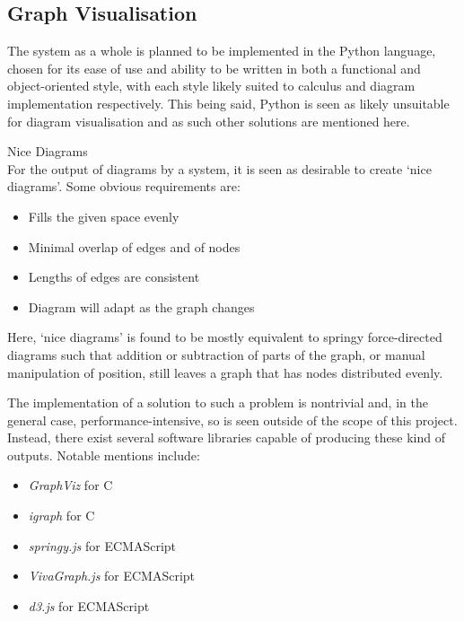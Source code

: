 \subsection{Graph Visualisation}

    The system as a whole is planned to be implemented in the Python language, chosen for its ease of use and ability to be written in both a functional and object-oriented style, with each style likely suited to calculus and diagram implementation respectively.
    This being said, Python is seen as likely unsuitable for diagram visualisation and as such other solutions are mentioned here.\\
    
    \begin{definition*}{Nice Diagrams\\}
        For the output of diagrams by a system, it is seen as desirable to create `nice diagrams'.
        Some obvious requirements are:
        \begin{itemize}
            \item Fills the given space evenly
            \item Minimal overlap of edges and of nodes
            \item Lengths of edges are consistent
            \item Diagram will adapt as the graph changes
        \end{itemize}
    \end{definition*}
    Here, `nice diagrams' is found to be mostly equivalent to springy force-directed diagrams such that addition or subtraction of parts of the graph, or manual manipulation of position, still leaves a graph that has nodes distributed evenly.


    \begin{examples}
        The implementation of a solution to such a problem is nontrivial and, in the general case, performance-intensive, so is seen outside of the scope of this project.
        Instead, there exist several software libraries capable of producing these kind of outputs.
        Notable mentions include:
        \begin{itemize}
            \item \textit{GraphViz} for C~\footnotemark
            \item \textit{igraph} for C~\addtocounter{footnote}{-1}\footnotemark
            \item \textit{springy.js} for ECMAScript
            \item \textit{VivaGraph.js} for ECMAScript
            \item \textit{d3.js} for ECMAScript
        \end{itemize}
    \end{examples}

